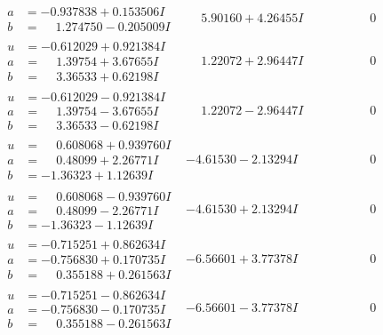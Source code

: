 \documentclass[1p]{elsarticle_modified}
\theoremstyle{definition}
\begin{document}
$$\begin{array}{c|c|c}
\begin{aligned}
a &= -0.937838 + 0.153506 I \\
b &= \phantom{-}1.274750 - 0.205009 I\end{aligned}
 & \phantom{-}5.90160 + 4.26455 I & \phantom{-0.000000 } 0 \\ \hline\begin{aligned}
u &= -0.612029 + 0.921384 I \\
a &= \phantom{-}1.39754 + 3.67655 I \\
b &= \phantom{-}3.36533 + 0.62198 I\end{aligned}
 & \phantom{-}1.22072 + 2.96447 I & \phantom{-0.000000 } 0 \\ \hline\begin{aligned}
u &= -0.612029 - 0.921384 I \\
a &= \phantom{-}1.39754 - 3.67655 I \\
b &= \phantom{-}3.36533 - 0.62198 I\end{aligned}
 & \phantom{-}1.22072 - 2.96447 I & \phantom{-0.000000 } 0 \\ \hline\begin{aligned}
u &= \phantom{-}0.608068 + 0.939760 I \\
a &= \phantom{-}0.48099 + 2.26771 I \\
b &= -1.36323 + 1.12639 I\end{aligned}
 & -4.61530 - 2.13294 I & \phantom{-0.000000 } 0 \\ \hline\begin{aligned}
u &= \phantom{-}0.608068 - 0.939760 I \\
a &= \phantom{-}0.48099 - 2.26771 I \\
b &= -1.36323 - 1.12639 I\end{aligned}
 & -4.61530 + 2.13294 I & \phantom{-0.000000 } 0 \\ \hline\begin{aligned}
u &= -0.715251 + 0.862634 I \\
a &= -0.756830 + 0.170735 I \\
b &= \phantom{-}0.355188 + 0.261563 I\end{aligned}
 & -6.56601 + 3.77378 I & \phantom{-0.000000 } 0 \\ \hline\begin{aligned}
u &= -0.715251 - 0.862634 I \\
a &= -0.756830 - 0.170735 I \\
b &= \phantom{-}0.355188 - 0.261563 I\end{aligned}
 & -6.56601 - 3.77378 I & \phantom{-0.000000 } 0 \\ \hline\begin{aligned}

\end{aligned}
\end{array}$$
\end{document}
